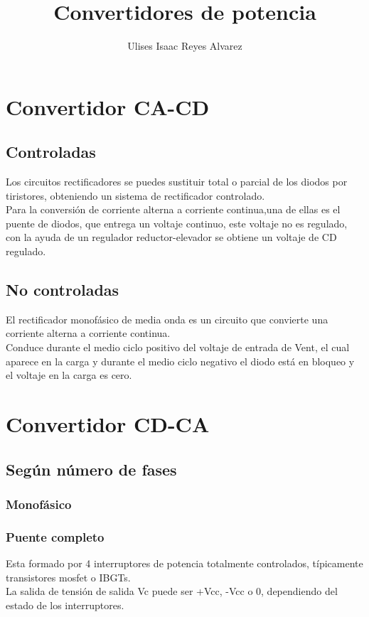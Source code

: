 \documentclass[12pt,a4paper]{article}
\author{Ulises Isaac Reyes Alvarez}
\title{Convertidores de potencia}
\begin{document}
\maketitle
\section{Convertidor CA-CD}
\subsection{Controladas} 
Los circuitos rectificadores se puedes sustituir total o parcial de los diodos por tiristores, obteniendo un sistema de rectificador controlado.\\
Para la conversión de corriente alterna a corriente continua,una de ellas es el puente de diodos, que entrega un voltaje continuo, este voltaje no es regulado, con la ayuda de un regulador reductor-elevador se obtiene un voltaje de CD regulado.\\

\subsection{No controladas}
El rectificador monofásico de media onda es un circuito que convierte una corriente alterna a corriente continua. \\
Conduce durante el medio ciclo positivo del voltaje de entrada de Vent, el cual aparece en la carga y durante el medio ciclo negativo el diodo está en bloqueo y el voltaje en la carga es cero.

\section{Convertidor CD-CA}
\subsection{Según número de fases}
\subsubsection{Monofásico}
\subsubsection*{Puente completo}
Esta formado por 4 interruptores de potencia totalmente controlados, típicamente transistores mosfet o IBGTs.\\
La salida de tensión de salida Vc puede ser +Vcc, -Vcc o 0, dependiendo del estado de los interruptores.\\
\end{document}
